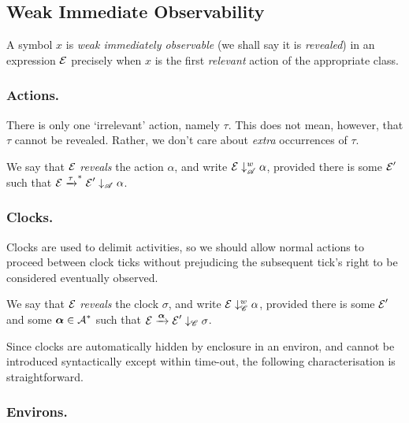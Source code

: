 \documentclass[orivec]{llncs}
\newcommand{\Exhibits}[1]{\mathrel{\downarrow_{#1}}}
\newcommand{\ExhibitsA}{\Exhibits{\mathscr{A}}}
\newcommand{\ExhibitsC}{\Exhibits{\mathscr{C}}}
\newcommand{\Reveals}[1]{\mathrel{\downarrow^{w}_{#1}}}
\newcommand{\RevealsA}{\Reveals{\mathscr{A}}}
\newcommand{\RevealsC}{\Reveals{\mathscr{C}}}
\newcommand{\Does}[1]{\xderives{#1}}
\newcommand{\DoesMany}[1]{\mathrel{{\xderives{#1}}^*}}
\begin{document}
\subsection{Weak Immediate Observability}
\label{sec:eventual-observability}

A symbol $x$ is \emph{weak immediately observable} (we shall say it is \emph{revealed}) in an expression $\text{$\mathcal{E}$}$ precisely when $x$ is the first \emph{relevant} action of the appropriate class.


\subsubsection{Actions.}

There is only one `irrelevant' action, namely $\tau$. This does not mean, however, that $\tau$ cannot be revealed. Rather, we don't care about \emph{extra} occurrences of $\tau$.

\begin{definition}
We say that $\text{$\mathcal{E}$}$ \emph{reveals} the action $\alpha$, and write $\expr \RevealsA \alpha$, provided there is some $\text{$\mathcal{E}$}'$ such that $\expr \DoesMany{\tau} \expr' \ExhibitsA \alpha$.
\end{definition}

\subsubsection{Clocks.}

Clocks are used to delimit activities, so we should allow normal actions to proceed between clock ticks without prejudicing the subsequent tick's right to be considered eventually observed.

\begin{definition}
We say that $\text{$\mathcal{E}$}$ \emph{reveals} the clock $\sigma$, and write $\expr \RevealsC \alpha$, provided there is some $\text{$\mathcal{E}$}'$ and some $\vec{\alpha} \in \act^*$ such that $\expr \Does{\vec{\alpha}} \expr' \ExhibitsC \sigma$.
\end{definition}

Since clocks are automatically hidden by enclosure in an environ, and cannot be introduced syntactically except within time-out, the following characterisation is straightforward.



\subsubsection{Environs.}
\end{document}
